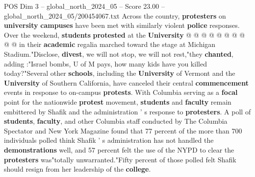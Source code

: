\begin{textsample}{POS Dim 3 – global\_north\_2024\_05 – Score 23.00 – global\_north\_2024\_05/200454067.txt}
Across the country, \textbf{protesters} on \textbf{university} \textbf{campuses} have been met with similarly violent \textbf{police} responses.
Over the weekend, \textbf{students} \textbf{protested} at the \textbf{University} @ @ @ @ @ @ @ @ @ @ in their \textbf{academic} regalia marched toward the stage at Michigan Stadium."Disclose, \textbf{divest}, we will not stop, we will not rest,"they \textbf{chanted}, adding :"Israel bombs, U of M pays, how many kids have you killed today?"Several other \textbf{schools}, including the \textbf{University} of Vermont and the \textbf{University} of Southern California, have canceled their central \textbf{commencement} events in response to on-campus \textbf{protests}.
With Columbia serving as a \textbf{focal} point for the nationwide \textbf{protest} movement, \textbf{students} and \textbf{faculty} remain embittered by Shafik and the administration ' s response to \textbf{protesters}.
A poll of \textbf{students}, \textbf{faculty}, and other Columbia staff conducted by The Columbia Spectator and New York Magazine found that 77 percent of the more than 700 individuals polled think Shafik ' s administration has not handled the \textbf{demonstrations} well, and 57 percent felt the use of the NYPD to clear the \textbf{protesters} was"totally unwarranted."Fifty percent of those polled felt Shafik should resign from her leadership of the \textbf{college}.

\end{textsample}
